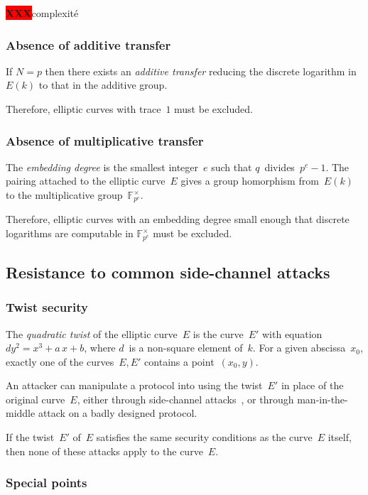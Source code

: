 \documentclass{article}
\def\F{\mathbb{F}}
\def\XXX{{\colorbox{red}{{\color{white}\bfseries XXX}}}}
\begin{document}
\XXX complexité

\subsubsection{Absence of additive transfer}

If $N = p$ then there exists an \emph{additive transfer}
reducing the discrete logarithm in~$E(k)$
to that in the additive group.

Therefore, elliptic curves with trace~$1$ must be excluded.

\subsubsection{Absence of multiplicative transfer}

The \emph{embedding degree} is the smallest integer~$e$ such that
$q$~divides~$p^e -1$.
The pairing attached to the elliptic curve~$E$
gives a group homorphism from~$E(k)$
to the multiplicative group~$\F_{p^e}^{×}$.

Therefore, elliptic curves with an embedding degree small enough
that discrete logarithms are computable in $\F_{p^e}^{×}$
must be excluded.

\subsection{Resistance to common side-channel attacks}

\subsubsection{Twist security}

The \emph{quadratic twist} of the elliptic curve~$E$
is the curve~$E'$ with equation~$d y^2 = x^3 + a\,x + b$,
where $d$~is a non-square element of~$k$.
For a given abscissa~$x_0$,
exactly one of the curves~$E, E'$ contains a point~$(x_0, y)$.

An attacker can manipulate a protocol into using the twist~$E'$
in place of the original curve~$E$,
either through side-channel attacks~\cite{fdtc2008flrv},
or through man-in-the-middle attack on a badly designed protocol.

If the twist~$E'$ of~$E$ satisfies
the same security conditions as the curve~$E$ itself, then
none of these attacks apply to the curve~$E$.

\subsubsection{Special points}
\end{document}
